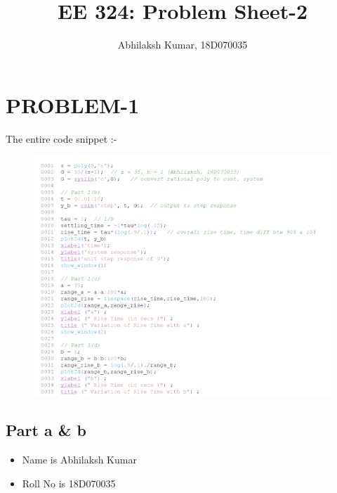 \documentclass[12pt]{article}
\title{EE 324: Problem Sheet-2}
\author{Abhilaksh Kumar, 18D070035}
\begin{document}
\maketitle

\section{PROBLEM-1}
The entire code snippet :-
    \begin{figure}[H]
        \centering
        \includegraphics[scale=0.8]{q1_code.png}
    \end{figure}
    \vspace{-2mm}
\subsection*{Part a \& b}
\begin{itemize}
\item Name is Abhilaksh Kumar
\item Roll No is 18D070035
\end{itemize}
\end{document}
